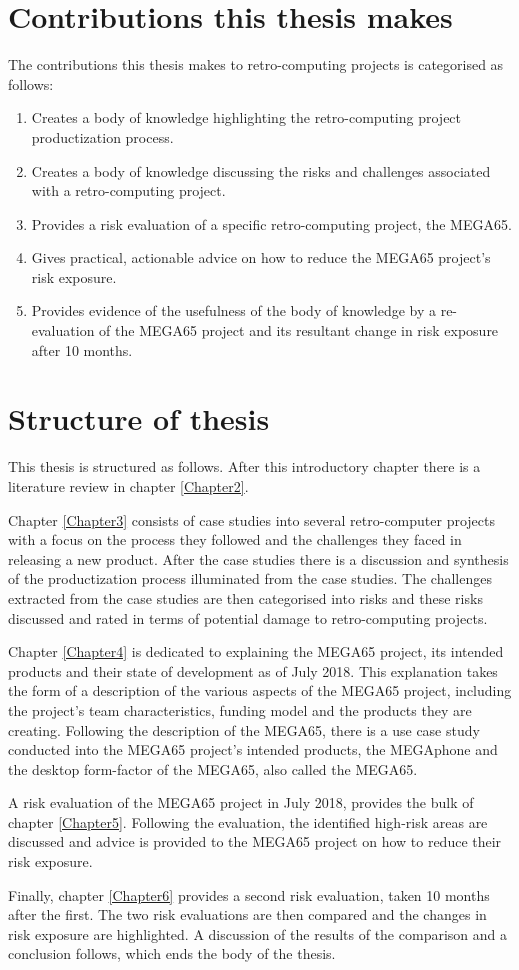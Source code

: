 \section{Contributions this thesis makes}
The contributions this thesis makes to retro-computing projects is categorised as follows:
\begin{enumerate}
\item Creates a body of knowledge highlighting the retro-computing project productization process.
\item Creates a body of knowledge discussing the risks and challenges associated with a retro-computing project.
\item Provides a risk evaluation of a specific retro-computing project, the MEGA65.
\item Gives practical, actionable advice on how to reduce the MEGA65 project's risk exposure.
\item Provides evidence of the usefulness of the body of knowledge by a re-evaluation of the MEGA65 project and its resultant change in risk exposure after 10 months.
\end{enumerate}

\section{Structure of thesis}
This thesis is structured as follows. After this introductory chapter there is a literature review in chapter \ref{Chapter2}. 

Chapter \ref{Chapter3} consists of case studies into several retro-computer projects with a focus on the process they followed and the challenges they faced in releasing a new product. After the case studies there is a discussion and synthesis of the productization process illuminated from the case studies. The challenges extracted from the case studies are then categorised into risks and these risks discussed and rated in terms of potential damage to retro-computing projects. 

Chapter \ref{Chapter4} is dedicated to explaining the MEGA65 project, its intended products and their state of development as of July 2018. This explanation takes the form of a description of the various aspects of the MEGA65 project, including the project's team characteristics, funding model and the products they are creating. Following the description of the MEGA65, there is a use case study conducted into the MEGA65 project's intended products, the MEGAphone and the desktop form-factor of the MEGA65, also called the MEGA65. 

A risk evaluation of the MEGA65 project in July 2018, provides the bulk of chapter \ref{Chapter5}. Following the evaluation, the identified high-risk areas are discussed and advice is provided to the MEGA65 project on how to reduce their risk exposure. 

Finally, chapter \ref{Chapter6} provides a second risk evaluation, taken 10 months after the first. The two risk evaluations are then compared and the changes in risk exposure are highlighted. A discussion of the results of the comparison and a conclusion follows, which ends the body of the thesis.
